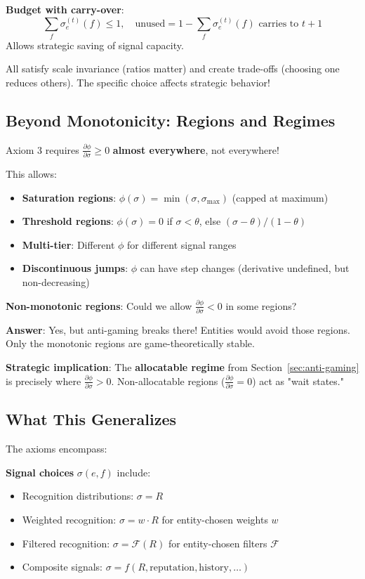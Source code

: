 \documentclass[11pt,a4paper]{article}
\theoremstyle{definition}
\theoremstyle{remark}
\newcommand{\F}{\mathcal{F}}
\begin{document}
\textbf{Budget with carry-over}:
\[ \sum_f \sigma_e^{(t)}(f) \le 1, \quad \text{unused} = 1 - \sum_f \sigma_e^{(t)}(f) \text{ carries to } t+1 \]
Allows strategic saving of signal capacity.

All satisfy scale invariance (ratios matter) and create trade-offs (choosing one reduces others). The specific choice affects strategic behavior!

\subsection{Beyond Monotonicity: Regions and Regimes}

Axiom 3 requires $\frac{\partial \phi}{\partial \sigma} \ge 0$ \textbf{almost everywhere}, not everywhere!

This allows:
\begin{itemize}
\item \textbf{Saturation regions}: $\phi(\sigma) = \min(\sigma, \sigma_{\max})$ (capped at maximum)
\item \textbf{Threshold regions}: $\phi(\sigma) = 0$ if $\sigma < \theta$, else $(\sigma - \theta)/(1-\theta)$
\item \textbf{Multi-tier}: Different $\phi$ for different signal ranges
\item \textbf{Discontinuous jumps}: $\phi$ can have step changes (derivative undefined, but non-decreasing)
\end{itemize}

\textbf{Non-monotonic regions}:
Could we allow $\frac{\partial \phi}{\partial \sigma} < 0$ in some regions?

\textbf{Answer}: Yes, but anti-gaming breaks there! Entities would avoid those regions. Only the monotonic regions are game-theoretically stable.

\textbf{Strategic implication}: The \textbf{allocatable regime} from Section~\ref{sec:anti-gaming} is precisely where $\frac{\partial \phi}{\partial \sigma} > 0$. Non-allocatable regions ($\frac{\partial \phi}{\partial \sigma} = 0$) act as "wait states."

\subsection{What This Generalizes}

The axioms encompass:

\textbf{Signal choices} $\sigma(e,f)$ include:
\begin{itemize}
\item Recognition distributions: $\sigma = R$
\item Weighted recognition: $\sigma = w \cdot R$ for entity-chosen weights $w$
\item Filtered recognition: $\sigma = \F(R)$ for entity-chosen filters $\F$
\item Composite signals: $\sigma = f(R, \text{reputation}, \text{history}, \ldots)$
\end{itemize}
\end{document}
